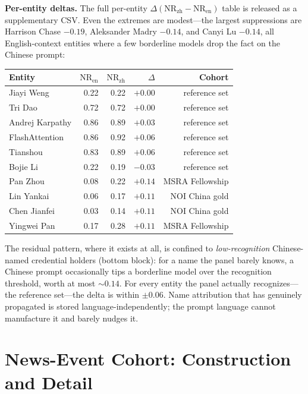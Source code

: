 \textbf{Per-entity deltas.} The full per-entity $\Delta(\mathrm{NR}_\mathrm{zh} - \mathrm{NR}_\mathrm{en})$ table is released as a supplementary CSV. Even the extremes are modest---the largest suppressions are Harrison Chase $-0.19$, Aleksander Madry $-0.14$, and Canyi Lu $-0.14$, all English-context entities where a few borderline models drop the fact on the Chinese prompt:

\begin{center}
\small
\begin{tabular}{lrrrr}
\toprule
Entity & $\mathrm{NR}_\mathrm{en}$ & $\mathrm{NR}_\mathrm{zh}$ & $\Delta$ & Cohort \\
\midrule
Jiayi Weng & 0.22 & 0.22 & $+0.00$ & reference set \\
Tri Dao & 0.72 & 0.72 & $+0.00$ & reference set \\
Andrej Karpathy & 0.86 & 0.89 & $+0.03$ & reference set \\
FlashAttention & 0.86 & 0.92 & $+0.06$ & reference set \\
Tianshou & 0.83 & 0.89 & $+0.06$ & reference set \\
Bojie Li & 0.22 & 0.19 & $-0.03$ & reference set \\
\midrule
Pan Zhou & 0.08 & 0.22 & $+0.14$ & MSRA Fellowship \\
Lin Yankai & 0.06 & 0.17 & $+0.11$ & NOI China gold \\
Chen Jianfei & 0.03 & 0.14 & $+0.11$ & NOI China gold \\
Yingwei Pan & 0.17 & 0.28 & $+0.11$ & MSRA Fellowship \\
\bottomrule
\end{tabular}
\end{center}

The residual pattern, where it exists at all, is confined to \emph{low-recognition} Chinese-named credential holders (bottom block): for a name the panel barely knows, a Chinese prompt occasionally tips a borderline model over the recognition threshold, worth at most ${\sim}0.14$. For every entity the panel actually recognizes---the reference set---the delta is within $\pm 0.06$. Name attribution that has genuinely propagated is stored language-independently; the prompt language cannot manufacture it and barely nudges it.


\section{News-Event Cohort: Construction and Detail}
\label{app:events}

